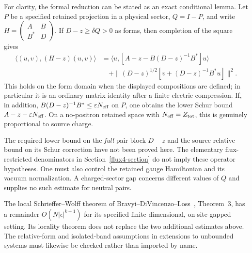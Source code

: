 For clarity, the formal reduction can be stated as an exact
conditional lemma. Let $P$ be a specified retained projection in a
physical sector, $Q=I-P$, and write
$H=\left(\begin{smallmatrix}A&B\\B^*&D\end{smallmatrix}\right)$.
If $D-z\ge\delta Q>0$ as forms, then completion of the square gives
\begin{align}
 \langle(u,v),(H-z)(u,v)\rangle
 &=\langle u,[A-z-B(D-z)^{-1}B^*]u\rangle \nonumber\\
 &\quad+\|(D-z)^{1/2}[v+(D-z)^{-1}B^*u]\|^2 .
 \label{rel4-schur-identity}
\end{align}
This holds on the form domain when the displayed compositions are
defined; in particular it is an ordinary matrix identity after a
finite electric compression. If, in addition,
$B(D-z)^{-1}B^*\le\varepsilon N_{\rm eff}$ on $P$, one obtains
the lower Schur bound $A-z-\varepsilon N_{\rm eff}$.
On a no-positron retained space with $N_{\rm eff}=Z_{\rm tot}$,
this is genuinely proportional to source charge.

The required lower bound on the \emph{full} pair block $D-z$ and
the source-relative bound on its Schur correction have not been
proved here. The elementary flux-restricted denominators in
Section~\ref{flux4-section} do not imply these operator hypotheses.
One must also control the retained gauge Hamiltonian and its
vacuum normalization. A charged-sector gap concerns different
values of $Q$ and supplies no such estimate for neutral pairs.

The local Schrieffer--Wolff theorem of
Bravyi--DiVincenzo--Loss~\cite{BDL}, Theorem~3, has a remainder
$O(N|\epsilon|^{k+1})$ for its specified finite-dimensional,
on-site-gapped setting. Its locality theorem does not replace the
two additional estimates above. The relative-form and isolated-band
assumptions in extensions to unbounded systems must likewise be
checked rather than imported by name.
